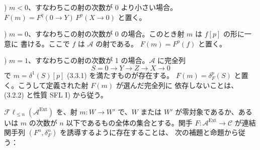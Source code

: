 ) $m<0$、すなわちこの射の次数が 0 より小さい場合。
$F(m)=F^q(0\longrightarrow Y)\,F^p(X\longrightarrow0)$ と置く。

) $m=0$、すなわちこの射の次数が 0 の場合。このとき射 $m$ は $f[p]$ の形に一意に
書ける。ここで $f$ は $\mathcal A$ の射である。
$F(m)=F^p(f)$ と置く。

) $m=1$、すなわちこの射の次数が 1 の場合。$\mathcal A$ に完全列
\[
S=0\longrightarrow Y\longrightarrow Z\longrightarrow X\longrightarrow0
\]
で $m=\delta^1(S)[p]$ (3.3.1) を満たすものが存在する。
$F(m)=\delta_F^p(S)$ と置く。こうして定義された射 $F(m)$ が選んだ完全列に
依存しないことは、(3.2.2) と性質 SFL I) から従う。

$\mathcal{F}\ell_{\leq n}(\mathcal A^{\operatorname{Ext}})$ を、射
$m\colon W\longrightarrow W'$ で、$W$ または $W'$ が零対象であるか、あるいは
$m$ の次数が $n$ 以下であるもの全体の集合とする。関手
$F\colon\mathcal A^{\operatorname{Ext}}\longrightarrow\mathcal C$ が連結関手列
$(F^n,\delta_F^n)$ を誘導するように存在することは、
次の補題と命題から従う：
\endgroup
